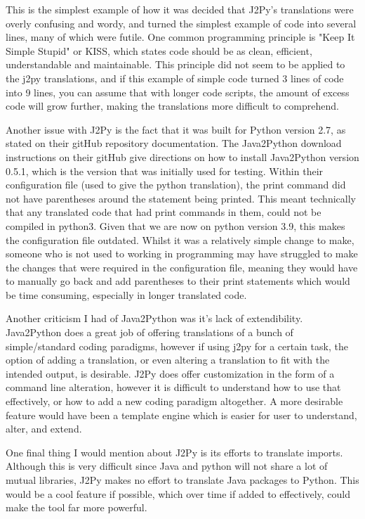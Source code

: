 \documentclass{l4proj}
\begin{document}
This is the simplest example of how it was decided that J2Py's translations were overly confusing and wordy, and turned the simplest example of code into several lines, many of which were futile. One common programming principle is "Keep It Simple Stupid" or KISS, which states code should be as clean, efficient, understandable and maintainable. This principle did not seem to be applied to the j2py translations, and if this example of simple code turned 3 lines of code into 9 lines, you can assume that with longer code scripts, the amount of excess code will grow further, making the translations more difficult to comprehend.

Another issue with J2Py is the fact that it was built for Python version 2.7, as stated on their gitHub repository documentation. The Java2Python download instructions on their gitHub give directions on how to install Java2Python version 0.5.1, which is the version that was initially used for testing. Within their configuration file (used to give the python translation), the print command did not have parentheses around the statement being printed. This meant technically that any translated code that had print commands in them, could not be compiled in python3. Given that we are now on python version 3.9, this makes the configuration file outdated. Whilst it was a relatively simple change to make, someone who is not used to working in programming may have struggled to make the changes that were required in the configuration file, meaning they would have to manually go back and add parentheses to their print statements which would be time consuming, especially in longer translated code.

Another criticism I had of Java2Python was it's lack of extendibility. Java2Python does a great job of offering translations of a bunch of simple/standard coding paradigms, however if using j2py for a certain task, the option of adding a translation, or even altering a translation to fit with the intended output, is desirable. J2Py does offer customization in the form of a command line alteration, however it is difficult to understand how to use that effectively, or how to add a new coding paradigm altogether. A more desirable feature would have been a template engine which is easier for user to understand, alter, and extend.

One final thing I would mention about J2Py is its efforts to translate imports. Although this is very difficult since Java and python will not share a lot of mutual libraries, J2Py makes no effort to translate Java packages to Python. This would be a cool feature if possible, which over time if added to effectively, could make the tool far more powerful.
\end{document}
